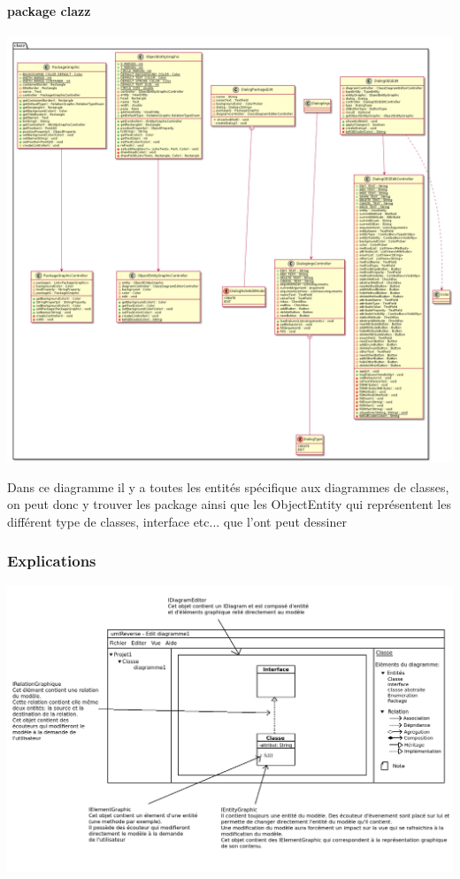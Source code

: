 \documentclass[a4paper,10pt]{article}
\begin{document}
    \paragraph{package clazz}
	  \begin{center}
	      \includegraphics[width=\textwidth]{DiagrammesVueVersion1erLivrable/clazz.png}
	  \end{center}
	  Dans ce diagramme il y a toutes les entités spécifique aux diagrammes de classes, on peut donc y trouver les package ainsi que les ObjectEntity 
	  qui représentent les différent type de classes, interface etc... que l'ont peut dessiner
	  
   
    \subsubsection{Explications}
	\begin{center}
	  \includegraphics[width=\textwidth]{Image/demonstration.png}
	\end{center}
      
\end{document}
